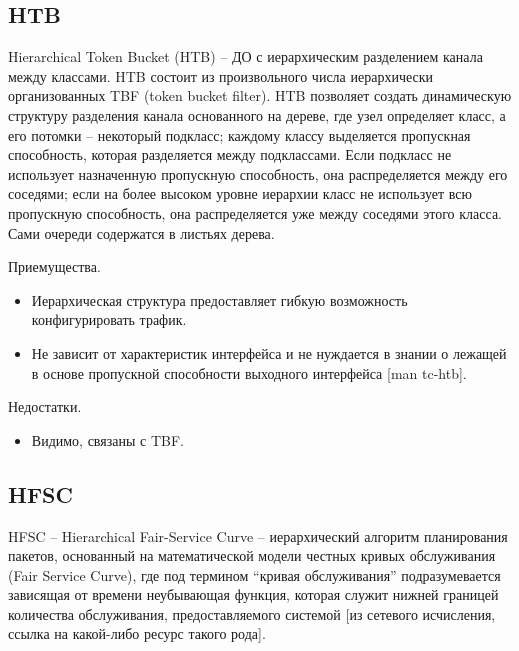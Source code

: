 	\subsection{HTB}

        Hierarchical Token Bucket (HTB) -- ДО с иерархическим разделением канала между классами. HTB
        состоит из произвольного числа иерархически организованных TBF (token bucket filter). HTB
        позволяет создать динамическую структуру разделения канала основанного
        на дереве, где узел определяет класс, а его потомки -- некоторый подкласс;
        каждому классу выделяется пропускная способность, которая разделяется между
        подклассами. Если подкласс не использует назначенную пропускную способность,
        она распределяется между его соседями; если на более высоком уровне иерархии
        класс не использует всю пропускную способность, она распределяется уже между
        соседями этого класса. Сами очереди содержатся в листьях дерева.

		Приемущества.
		\begin{itemize}
			\item Иерархическая структура предоставляет гибкую возможность конфигурировать трафик.
            \item Не зависит от характеристик интерфейса и не нуждается в знании о лежащей в основе пропускной способности выходного интерфейса [man tc-htb].
		\end{itemize}

		Недостатки.
		\begin{itemize}
			\item Видимо, связаны с TBF.
		\end{itemize}

	\subsection{HFSC}



        HFSC -- Hierarchical Fair-Service Curve -- иерархический алгоритм планирования пакетов,
        основанный на математической модели честных кривых обслуживания (Fair Service Curve),
        где под термином “кривая обслуживания” подразумевается зависящая от времени
        неубывающая функция, которая служит нижней границей количества обслуживания,
        предоставляемого системой [из сетевого исчисления, ссылка на какой-либо ресурс
        такого рода].

